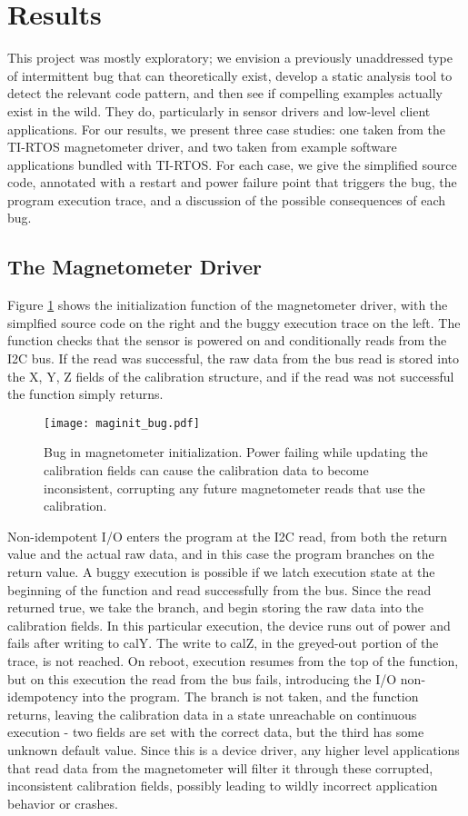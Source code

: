 \section{Results}
This project was mostly exploratory; we envision a previously unaddressed type of intermittent bug that can theoretically exist, develop a static analysis tool to detect the relevant code pattern, and then see if compelling examples actually exist in the wild. They do, particularly in sensor drivers and low-level client applications. For our results, we present three case studies: one taken from the TI-RTOS magnetometer driver, and two taken from example software applications bundled with TI-RTOS. For each case, we give the simplified source code, annotated with a restart and power failure point that triggers the bug, the program execution trace, and a discussion of the possible consequences of each bug.

\subsection{The Magnetometer Driver}

Figure \ref{fig:mag} shows the initialization function of the magnetometer driver, with the simplfied source code on the right and the buggy execution trace on the left. The function checks that the sensor is powered on and conditionally reads from the I2C bus. If the read was successful, the raw data from the bus read is stored into the X, Y, Z fields of the calibration structure, and if the read was not successful the function simply returns. 
\begin{figure}[h]
\centering
\texttt{[image: maginit\_bug.pdf]}
\caption{Bug in magnetometer initialization. Power failing while updating the calibration fields can cause the calibration data to become inconsistent, corrupting any future magnetometer reads that use the calibration.}
\label{fig:mag}
\end{figure}

Non-idempotent I/O enters the program at the I2C read, from both the return value and the actual raw data, and in this case the program branches on the return value. A buggy execution is possible if we latch execution state at the beginning of the function and read successfully from the bus. Since the read returned true, we take the branch, and begin storing the raw data into the calibration fields. In this particular execution, the device runs out of power and fails after writing to calY. The write to calZ, in the greyed-out portion of the trace, is not reached. On reboot, execution resumes from the top of the function, but on this execution the read from the bus fails, introducing the I/O non-idempotency into the program. The branch is not taken, and the function returns, leaving the calibration data in a state unreachable on continuous execution - two fields are set with the correct data, but the third has some unknown default value. 
Since this is a device driver, any higher level applications that read data from the magnetometer will filter it through these corrupted, inconsistent calibration fields, possibly leading to wildly incorrect application behavior or crashes.  

